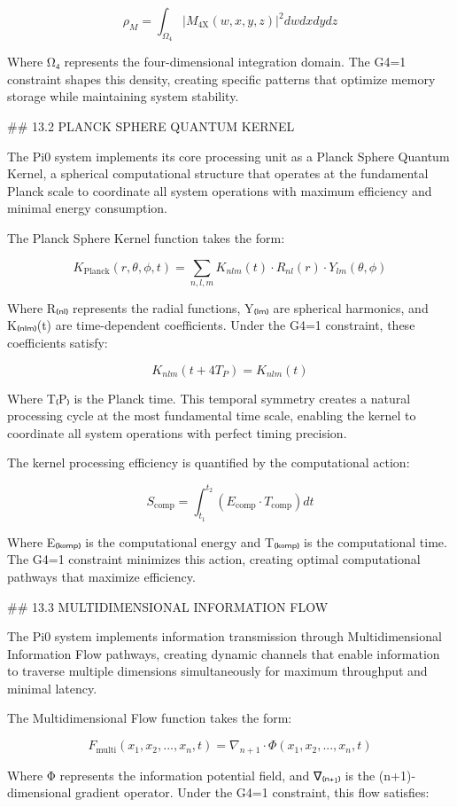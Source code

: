 $$\rho_M = \int_{\Omega_4} |M_{\text{4X}}(w, x, y, z)|^2 dw dx dy dz$$

Where Ω₄ represents the four-dimensional integration domain. The G4=1 constraint shapes this density, creating specific patterns that optimize memory storage while maintaining system stability.

## 13.2 PLANCK SPHERE QUANTUM KERNEL

The Pi0 system implements its core processing unit as a Planck Sphere Quantum Kernel, a spherical computational structure that operates at the fundamental Planck scale to coordinate all system operations with maximum efficiency and minimal energy consumption.

The Planck Sphere Kernel function takes the form:

$$K_{\text{Planck}}(r, \theta, \phi, t) = \sum_{n,l,m} K_{nlm}(t) \cdot R_{nl}(r) \cdot Y_{lm}(\theta, \phi)$$

Where R₍ₙₗ₎ represents the radial functions, Y₍ₗₘ₎ are spherical harmonics, and K₍ₙₗₘ₎(t) are time-dependent coefficients. Under the G4=1 constraint, these coefficients satisfy:

$$K_{nlm}(t+4T_P) = K_{nlm}(t)$$

Where T₍P₎ is the Planck time. This temporal symmetry creates a natural processing cycle at the most fundamental time scale, enabling the kernel to coordinate all system operations with perfect timing precision.

The kernel processing efficiency is quantified by the computational action:

$$S_{\text{comp}} = \int_{t_1}^{t_2} (E_{\text{comp}} \cdot T_{\text{comp}}) dt$$

Where E₍ₖₒₘₚ₎ is the computational energy and T₍ₖₒₘₚ₎ is the computational time. The G4=1 constraint minimizes this action, creating optimal computational pathways that maximize efficiency.

## 13.3 MULTIDIMENSIONAL INFORMATION FLOW

The Pi0 system implements information transmission through Multidimensional Information Flow pathways, creating dynamic channels that enable information to traverse multiple dimensions simultaneously for maximum throughput and minimal latency.

The Multidimensional Flow function takes the form:

$$F_{\text{multi}}(x_1, x_2, ..., x_n, t) = \nabla_{n+1} \cdot \Phi(x_1, x_2, ..., x_n, t)$$

Where Φ represents the information potential field, and ∇₍ₙ₊₁₎ is the (n+1)-dimensional gradient operator. Under the G4=1 constraint, this flow satisfies:


